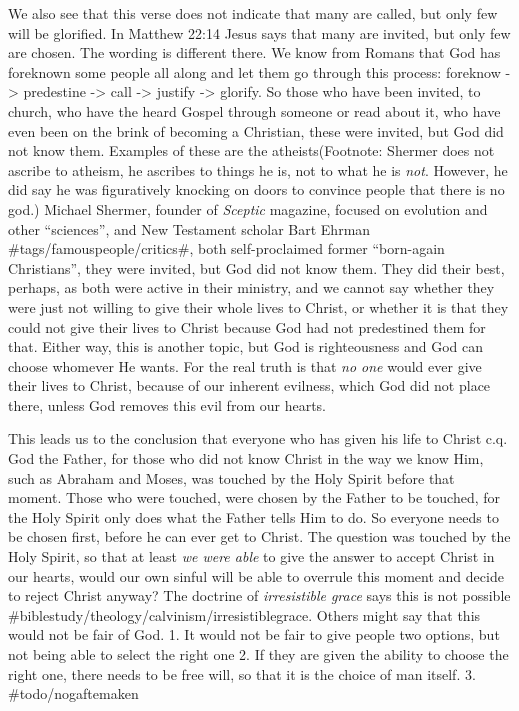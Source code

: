 We also see that this verse does not indicate that many are called, but
only few will be glorified. In Matthew 22:14 Jesus says that many are
invited, but only few are chosen. The wording is different there. We
know from Romans that God has foreknown some people all along and let
them go through this process: foreknow -\textgreater{} predestine
-\textgreater{} call -\textgreater{} justify -\textgreater{} glorify. So
those who have been invited, to church, who have the heard Gospel
through someone or read about it, who have even been on the brink of
becoming a Christian, these were invited, but God did not know them.
Examples of these are the atheists(Footnote: Shermer does not ascribe to
atheism, he ascribes to things he is, not to what he is \emph{not}.
However, he did say he was figuratively knocking on doors to convince
people that there is no god.) Michael Shermer, founder of \emph{Sceptic}
magazine, focused on evolution and other ``sciences'', and New Testament
scholar Bart Ehrman \#tags/famouspeople/critics\#, both self-proclaimed
former ``born-again Christians'', they were invited, but God did not
know them. They did their best, perhaps, as both were active in their
ministry, and we cannot say whether they were just not willing to give
their whole lives to Christ, or whether it is that they could not give
their lives to Christ because God had not predestined them for that.
Either way, this is another topic, but God is righteousness and God can
choose whomever He wants. For the real truth is that \emph{no one} would
ever give their lives to Christ, because of our inherent evilness, which
God did not place there, unless God removes this evil from our hearts.

This leads us to the conclusion that everyone who has given his life to
Christ c.q. God the Father, for those who did not know Christ in the way
we know Him, such as Abraham and Moses, was touched by the Holy Spirit
before that moment. Those who were touched, were chosen by the Father to
be touched, for the Holy Spirit only does what the Father tells Him to
do. So everyone needs to be chosen first, before he can ever get to
Christ. The question was touched by the Holy Spirit, so that at least
\emph{we were able} to give the answer to accept Christ in our hearts,
would our own sinful will be able to overrule this moment and decide to
reject Christ anyway? The doctrine of \emph{irresistible grace} says
this is not possible \#biblestudy/theology/calvinism/irresistiblegrace.
Others might say that this would not be fair of God. 1. It would not be
fair to give people two options, but not being able to select the right
one 2. If they are given the ability to choose the right one, there
needs to be free will, so that it is the choice of man itself. 3.
\#todo/nogaftemaken

